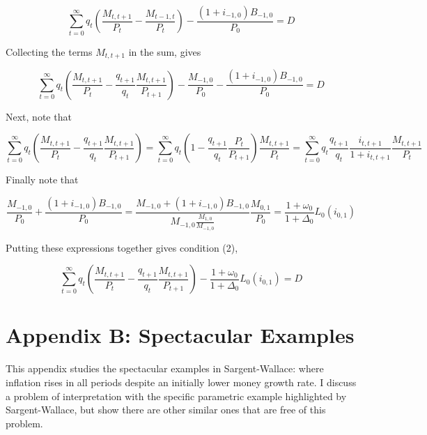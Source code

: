 \documentclass[10pt]{article}
\begin{document}
\begin{equation*}
\sum_{t=0}^{\infty} q_{t}\left(\frac{M_{t, t+1}}{P_{t}}-\frac{M_{t-1, t}}{P_{t}}\right)-\frac{\left(1+i_{-1,0}\right) B_{-1,0}}{P_{0}}=D
\end{equation*}

Collecting the terms $M_{t, t+1}$ in the sum, gives

\begin{equation*}
\sum_{t=0}^{\infty} q_{t}\left(\frac{M_{t, t+1}}{P_{t}}-\frac{q_{t+1}}{q_{t}} \frac{M_{t, t+1}}{P_{t+1}}\right)-\frac{M_{-1,0}}{P_{0}}-\frac{\left(1+i_{-1,0}\right) B_{-1,0}}{P_{0}}=D
\end{equation*}

Next, note that

\begin{equation*}
\sum_{t=0}^{\infty} q_{t}\left(\frac{M_{t, t+1}}{P_{t}}-\frac{q_{t+1}}{q_{t}} \frac{M_{t, t+1}}{P_{t+1}}\right)=\sum_{t=0}^{\infty} q_{t}\left(1-\frac{q_{t+1}}{q_{t}} \frac{P_{t}}{P_{t+1}}\right) \frac{M_{t, t+1}}{P_{t}}=\sum_{t=0}^{\infty} q_{t} \frac{q_{t+1}}{q_{t}} \frac{i_{t, t+1}}{1+i_{t, t+1}} \frac{M_{t, t+1}}{P_{t}}
\end{equation*}

Finally note that

\begin{equation*}
\frac{M_{-1,0}}{P_{0}}+\frac{\left(1+i_{-1,0}\right) B_{-1,0}}{P_{0}}=\frac{M_{-1,0}+\left(1+i_{-1,0}\right) B_{-1,0}}{M_{-1,0} \frac{M_{1,0}}{M_{-1,0}}} \frac{M_{0,1}}{P_{0}}=\frac{1+\omega_{0}}{1+\Delta_{0}} L_{0}\left(i_{0,1}\right)
\end{equation*}

Putting these expressions together gives condition (2),

\begin{equation*}
\sum_{t=0}^{\infty} q_{t}\left(\frac{M_{t, t+1}}{P_{t}}-\frac{q_{t+1}}{q_{t}} \frac{M_{t, t+1}}{P_{t+1}}\right)-\frac{1+\omega_{0}}{1+\Delta_{0}} L_{0}\left(i_{0,1}\right)=D
\end{equation*}

\section*{Appendix B: Spectacular Examples}
This appendix studies the spectacular examples in Sargent-Wallace: where inflation rises in all periods despite an initially lower money growth rate. I discuss a problem of interpretation with the specific parametric example highlighted by Sargent-Wallace, but show there are other similar ones that are free of this problem.
\end{document}
